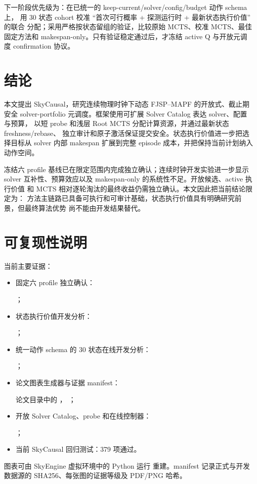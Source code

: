 \documentclass[11pt,a4paper]{article}
\newcommand{\method}{SkyCausal}
\begin{document}
下一阶段优先级为：在已统一的 keep-current/solver/config/budget 动作 schema 上，
用 30 状态 cohort 校准 ``首次可行概率 + 探测运行时 + 最新状态执行价值'' 的联合
分配；采用严格按状态留组的验证，比较原始 MCTS、校准 MCTS、最佳固定方法和
makespan-only。只有验证稳定通过后，才冻结 active Q 与开放元调度 confirmation
协议。

\section{结论}
\label{sec:conclusion}

本文提出 \method{}，研究连续物理时钟下动态 FJSP--MAPF 的开放式、截止期安全
solver-portfolio 元调度。框架使用可扩展 Solver Catalog 表达 solver、配置与预算，
以短 probe 和浅层 Root MCTS 分配计算资源，并通过最新状态 freshness/rebase、
独立审计和原子激活保证提交安全。状态执行价值进一步把选择目标从 solver 内部
makespan 扩展到完整 episode 成本，并把保持当前计划纳入动作空间。

冻结六 profile 基线已在限定范围内完成独立确认；连续时钟开发实验进一步显示
solver 互补性、预算效应以及 makespan-only 的系统性不足。开放候选、active 执行价值
和 MCTS 相对逐轮淘汰的最终收益仍需独立确认。本文因此把当前结论限定为：
方法主链路已具备可执行和可审计基础，状态执行价值具有明确研究前景，但最终算法优势
尚不能由开发结果替代。

\section*{可复现性说明}

当前主要证据：
\begin{itemize}
    \item 固定六 profile 独立确认：
    \par
    ；
    \item 状态执行价值开发分析：
    \par
    ；
    \item 统一动作 schema 的 30 状态在线开发分析：
    \par
    ；
    \item 论文图表生成器与证据 manifest：
    \par
    论文目录中的 ，
    ；
    \item 开放 Solver Catalog、probe 和在线控制器：
    \par
    ；
    \item 当前 SkyCausal 回归测试：379 项通过。
\end{itemize}
图表可由 SkyEngine 虚拟环境中的 Python 运行
 重建。manifest 记录正式与开发数据源的
SHA256、每张图的证据等级及 PDF/PNG 哈希。



\end{document}
